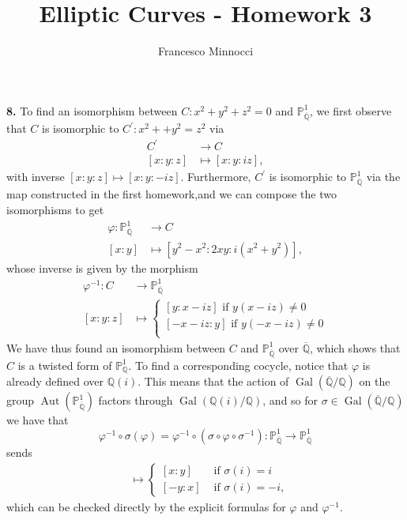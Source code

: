 \documentclass[a4paper]{article}
\title{Elliptic Curves - Homework 3}
\author{Francesco Minnocci}
\theoremstyle{definition}
\theoremstyle{definition}
\theoremstyle{remark}
\theoremstyle{definition}
\begin{document}
\maketitle

\textbf{8.}
To find an isomorphism between
$C: x^2+y^2+z^2=0$ and $\mathbb{P}^1_{\overline{\mathbb{Q}}}$, we first observe that $C$ is isomorphic to $C^\prime: x^2++y^2=z^2$ via
\begin{align*}
        C^\prime & \to C             \\
        [x:y:z]  & \mapsto [x:y:iz],
\end{align*}
with inverse $[x:y:z] \mapsto [x:y:-iz]$. Furthermore, $C^\prime$ is isomorphic to $\mathbb{P}^1_{\overline{\mathbb{Q}}}$ via the map constructed in the first homework,and we can compose the two isomorphisms to get
\begin{align*}
        \varphi:\mathbb{P}^1_{\overline{\mathbb{Q}}} & \to C                             \\
        [x:y]                                        & \mapsto [y^2-x^2:2xy:i(x^2+y^2)],
\end{align*}
whose inverse is given by the morphism
\begin{align*}
        \varphi^{-1}:C & \longrightarrow \mathbb{P}^1_{\overline{\mathbb{Q}}} \\
        [x:y:z]        & \longmapsto \begin{cases}
                                             [y:x-iz]\text{ if } y(x-iz)\neq 0   \\
                                             [-x-iz:y]\text{ if } y(-x-iz)\neq 0 \\
                                     \end{cases}
\end{align*}
We have thus found an isomorphism between $C$ and $\mathbb{P}^1_{\overline{\mathbb{Q}}}$ over $\overline{\mathbb{Q}}$, which shows that $C$ is a twisted form of $\mathbb{P}^1_\mathbb{Q}$. To find a corresponding cocycle, notice that $\varphi$ is already defined over $\mathbb{Q}(i)$. This means that the action of $\operatorname{Gal}(\overline{\mathbb{Q}}/\mathbb{Q})$ on the group $\operatorname{Aut}(\mathbb{P}^1_{\overline{\mathbb{Q}}})$ factors through $\operatorname{Gal}(\mathbb{Q}(i)/\mathbb{Q})$, and so
for $\sigma \in \operatorname{Gal}(\overline{\mathbb{Q}}/\mathbb{Q})$ we have that
\[
        \varphi^{-1}\circ \sigma(\varphi)=\varphi^{-1}\circ(\sigma\circ\varphi\circ\sigma^{-1}): \mathbb{P}^1_{\overline{\mathbb{Q}}}  \longrightarrow \mathbb{P}^1_{\overline{\mathbb{Q}}}
\]
sends
\begin{align*}
        [x:y] & \longmapsto \begin{cases}
                                    [x:y]  & \text{ if }   \sigma(i)=i  \\
                                    [-y:x] & \text{ if }  \sigma(i)=-i,
                            \end{cases}
\end{align*}
which can be checked directly by the explicit formulas for $\varphi$ and $\varphi^{-1}$.
\end{document}
